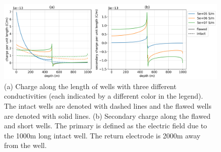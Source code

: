 \begin{figure}
    \begin{center}
    \includegraphics[width=\textwidth]{figures/dc_casing/casing_charge_sigma_casing.png}
    \end{center}
\caption{
    (a) Charge along the length of wells with three different
    conductivities (each indicated by a different color in the legend).
    The intact wells are denoted with dashed lines and the flawed wells
    are denoted with solid lines.
    (b) Secondary charge along the flawed and short wells. The primary is
    defined as the electric field due to the 1000m long intact well. The return electrode
    is 2000m away from the well.
}
\label{fig:casing_charge_sigma_casing}
\end{figure}
